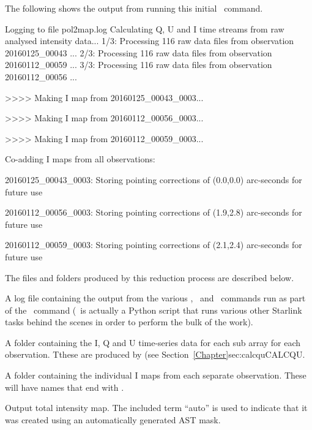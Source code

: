 The following shows the output from running this initial \poltwomap\
command.

\begin{terminalv}
Logging to file pol2map.log
Calculating Q, U and I time streams from raw analysed intensity data...
   1/3: Processing 116 raw data files from observation 20160125_00043 ...
   2/3: Processing 116 raw data files from observation 20160112_00059 ...
   3/3: Processing 116 raw data files from observation 20160112_00056 ...

>>>>   Making I map from 20160125_00043_0003...

>>>>   Making I map from 20160112_00056_0003...

>>>>   Making I map from 20160112_00059_0003...

Co-adding I maps from all observations:

20160125_00043_0003: Storing pointing corrections of (0.0,0.0) arc-seconds
for future use

20160112_00056_0003: Storing pointing corrections of (1.9,2.8) arc-seconds
for future use

20160112_00059_0003: Storing pointing corrections of (2.1,2.4) arc-seconds
for future use

\end{terminalv}

The files and folders produced by this reduction process are described below.

\begin{aligndesc}
\item[\file{pol2map.log}] A log file containing the output from the
  various \SMURF, \KAPPA\ and \POLPACK\ commands run as part of the \poltwomap\
  command (\poltwomap\ is actually a Python script that runs various other
  Starlink tasks behind the scenes in order to perform the bulk of the work).

\item[\file{qudata/}] A folder containing the I, Q and U time-series data
  for each sub array for each observation. Tthese are produced by
  \task{calcqu} (see Section~\cref{Chapter}{sec:calcqu}{CALCQU}.

\item[\file{maps/}] A folder containing the individual I maps from
  each separate observation. These will have names that end with
  \file{$\_$imap.sdf}.

\item[\file{iauto.sdf}] Output total intensity map. The included term ``auto'' is
used to indicate that it was created using an automatically generated
AST mask.

\end{aligndesc}

